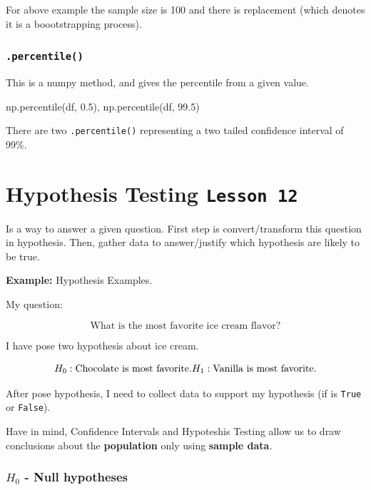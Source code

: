 \documentclass[]{book}
\newenvironment{Shaded}{\begin{snugshade}}{\end{snugshade}}
\newcommand{\FloatTok}[1]{\textcolor[rgb]{0.00,0.00,0.81}{#1}}
\newcommand{\NormalTok}[1]{#1}
\begin{document}
For above example the sample size is 100 and there is replacement (which
denotes it is a boootstrapping process).

\subsubsection{\texorpdfstring{\texttt{.percentile()}}{.percentile()}}\label{percentile}

This is a numpy method, and gives the percentile from a given value.

\begin{Shaded}
\begin{Highlighting}[]
\NormalTok{np.percentile(df, }\FloatTok{0.5}\NormalTok{), np.percentile(df, }\FloatTok{99.5}\NormalTok{)}
\end{Highlighting}
\end{Shaded}

There are two \texttt{.percentile()} representing a two tailed
confidence interval of 99\%.

\section{\texorpdfstring{Hypothesis Testing
\texttt{Lesson\ 12}}{Hypothesis Testing Lesson 12}}\label{hypothesis-testing-lesson-12}

Is a way to answer a given question. First step is convert/transform
this question in hypothesis. Then, gather data to answer/justify which
hypothesis are likely to be true.

\textbf{Example:} Hypothesis Examples.

My question:

\[ \text{What is the most favorite ice cream flavor?} \]

I have pose two hypothesis about ice cream.

\[H_0: \text{Chocolate is most favorite.} \\
  H_1:\text{Vanilla is most favorite.} \]

After pose hypothesis, I need to collect data to support my hypothesis
(if is \texttt{True} or \texttt{False}).

Have in mind, Confidence Intervals and Hypoteshis Testing allow us to
draw conclusions about the \textbf{population} only using \textbf{sample
data}.

\subsubsection*{\texorpdfstring{\(H_0\) - Null
hypotheses}{H\_0 - Null hypotheses}}\label{h_0---null-hypotheses}
\end{document}
